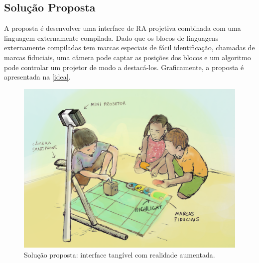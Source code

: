 \subsection{Solução Proposta}
\label{ss_cintro_solucao}

A proposta é desenvolver uma interface de \ac{RA} projetiva combinada com uma linguagem externamente compilada. Dado que os blocos de linguagens externamente compiladas tem marcas especiais de fácil identificação, chamadas de marcas fiduciais, uma câmera pode captar as posições dos blocos e um algoritmo pode controlar um projetor de modo a destacá-los. Graficamente, a proposta é apresentada na \autoref{idea}.
\begin{figure}[!htpb]
  \centering
  \includegraphics[width=.85\linewidth,fbox]{figs/idea_2.png}
  \caption{Solução proposta: interface tangível com realidade aumentada.}
  \sourceauthor
  \label{idea}
\end{figure}

